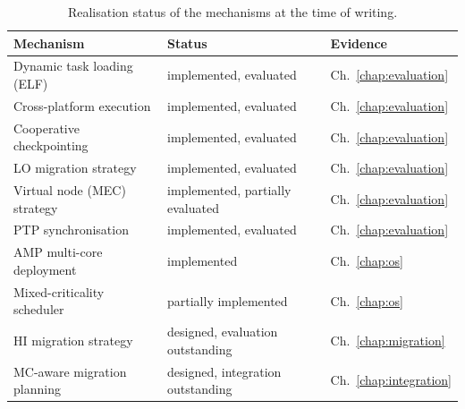 \begin{table}[t]
	\centering
	\caption{Realisation status of the mechanisms at the time of writing.}
	\label{tab:implstatus}
	\small
	\begin{tabular}{@{}lll@{}}
		\toprule
		Mechanism & Status & Evidence \\
		\midrule
		Dynamic task loading (ELF)        & implemented, evaluated
		& Ch.~\ref{chap:evaluation} \\
		Cross-platform execution          & implemented, evaluated
		& Ch.~\ref{chap:evaluation} \\
		Cooperative checkpointing         & implemented, evaluated
		& Ch.~\ref{chap:evaluation} \\
		\textsf{LO} migration strategy    & implemented, evaluated
		& Ch.~\ref{chap:evaluation} \\
		Virtual node (MEC) strategy       & implemented, partially evaluated
		& Ch.~\ref{chap:evaluation} \\
		PTP synchronisation               & implemented, evaluated
		& Ch.~\ref{chap:evaluation} \\
		AMP multi-core deployment         & implemented
		& Ch.~\ref{chap:os} \\
		Mixed-criticality scheduler       & partially implemented
		& Ch.~\ref{chap:os} \\
		\textsf{HI} migration strategy    & designed, evaluation outstanding
		& Ch.~\ref{chap:migration} \\
		MC-aware migration planning       & designed, integration outstanding
		& Ch.~\ref{chap:integration} \\
		\bottomrule
	\end{tabular}
\end{table}

	
